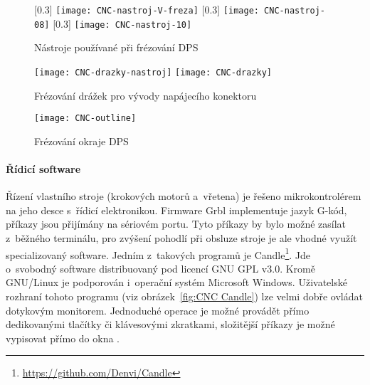 \begin{figure}[htbp]
    \centering
    [0.3\textwidth]{%
        \texttt{[image: CNC-nastroj-V-freza]}%
    }
    [0.3\textwidth]{%
        \texttt{[image: CNC-nastroj-08]}%
    }
    [0.3\textwidth]{%
        \texttt{[image: CNC-nastroj-10]}%
    }
    \caption{Nástroje používané při frézování DPS}
    \label{fig:CNC nastroje}
\end{figure}

\begin{figure}[htbp]
    \centering
    \texttt{[image: CNC-drazky-nastroj]}
    \hfill
    \texttt{[image: CNC-drazky]}
    \caption{Frézování drážek pro vývody napájecího konektoru}
    \label{fig:CNC drazky}
\end{figure}

\begin{figure}[htbp]
    \centering
    \texttt{[image: CNC-outline]}
    \caption{Frézování okraje DPS}
    \label{fig:CNC outline}
\end{figure}


\paragraph{Řídicí software}
Řízení vlastního stroje (krokových motorů a~vřetena) je řešeno mikrokontrolérem
na jeho desce s~řídicí elektronikou. Firmware Grbl implementuje jazyk
G-kód, příkazy jsou přijímány na sériovém portu. Tyto příkazy by bylo možné
zasílat z~běžného terminálu, pro zvýšení pohodlí při obsluze stroje je ale
vhodné využít specializovaný software. Jedním z~takových programů je
Candle\footnote{\url{https://github.com/Denvi/Candle}}. Jde o~svobodný software
distribuovaný pod licencí GNU GPL v3.0. Kromě GNU/Linux je podporován
i~operační systém Microsoft Windows. Uživatelské rozhraní tohoto programu (viz
obrázek~\vref{fig:CNC Candle}) lze velmi dobře ovládat dotykovým monitorem.
Jednoduché operace je možné provádět přímo dedikovanými tlačítky či klávesovými
zkratkami, složitější příkazy je možné vypisovat přímo do okna .


